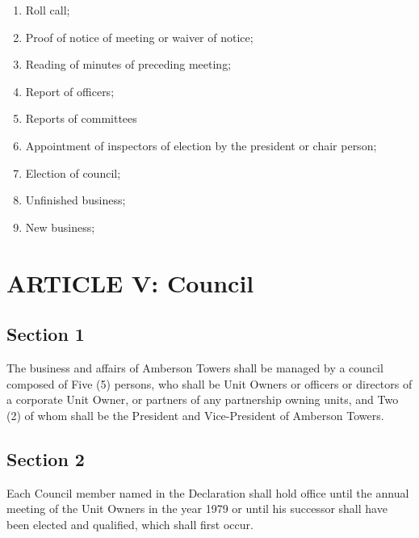 \documentclass[
  14pt,
]{book}
\providecommand{\tightlist}{%
  \setlength{\itemsep}{0pt}\setlength{\parskip}{0pt}}
\begin{document}
\begin{enumerate}
\def\labelenumi{(\alph{enumi})}
\tightlist
\item
  Roll call;\\
\item
  Proof of notice of meeting or waiver of notice;\\
\item
  Reading of minutes of preceding meeting;\\
\item
  Report of officers;\\
\item
  Reports of committees\\
\item
  Appointment of inspectors of election by the president or chair person;\\
\item
  Election of council;\\
\item
  Unfinished business;\\
\item
  New business;
\end{enumerate}

\hypertarget{article-v-council}{%
\section*{ARTICLE V: Council}\label{article-v-council}}

\hypertarget{section-1-4}{%
\subsection*{Section 1}\label{section-1-4}}

The business and affairs of Amberson Towers shall be managed by a council composed of Five (5) persons, who shall be Unit Owners or officers or directors of a corporate Unit Owner, or partners of any partnership owning units, and Two (2) of whom shall be the President and Vice-President of Amberson Towers.

\hypertarget{section-2-4}{%
\subsection*{Section 2}\label{section-2-4}}

Each Council member named in the Declaration shall hold office until the annual meeting of the Unit Owners in the year 1979 or until his successor shall have been elected and qualified, which shall first occur.
\end{document}
